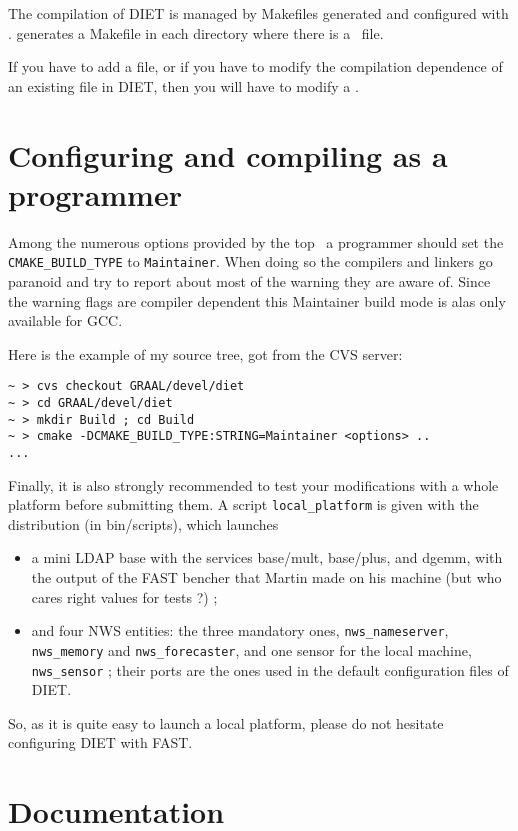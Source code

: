 The compilation of DIET is managed by Makefiles generated and
configured with \cmake.
\cmake generates a Makefile in each directory where there is a
\CMakeLists\ file.

If you have to add a file, or if you have to modify the compilation
dependence of an existing file in DIET, then you will have to modify a
\CMakeLists. 

\section{Configuring and compiling as a programmer}

Among the numerous options provided by the top \CMakeLists\ a
programmer should set the \verb+CMAKE_BUILD_TYPE+ to \verb+Maintainer+.
When doing so the compilers and linkers go paranoid and try to report
about most of the warning they are aware of.
Since the warning flags are compiler dependent this Maintainer build mode
is alas only available for GCC.

Here is the example of my source tree, got from the CVS server:
\begin{verbatim}
~ > cvs checkout GRAAL/devel/diet
~ > cd GRAAL/devel/diet
~ > mkdir Build ; cd Build
~ > cmake -DCMAKE_BUILD_TYPE:STRING=Maintainer <options> ..
...
\end{verbatim}

Finally, it is also strongly recommended to test your modifications
with a whole platform before submitting them.
A script \texttt{local\_platform} is given with the distribution
(in \textsf{bin/scripts}), which launches
\begin{itemize}
\item a mini LDAP base with the services \textsf{base/mult},
  \textsf{base/plus}, and \textsf{dgemm}, with the output of the FAST
  bencher that Martin made on his machine (but who cares right values
  for tests ?) ;
\item and four NWS entities: the three mandatory ones,
  \texttt{nws\_nameserver}, \texttt{nws\_memory} and
  \texttt{nws\_forecaster}, and one sensor for the local machine,
  \texttt{nws\_sensor} ; their ports are the ones used in the default
  configuration files of DIET.
\end{itemize}
So, as it is quite easy to launch a local platform, please do not
hesitate configuring DIET with FAST.

\section{Documentation}
\label{section:compiling-documentation}

